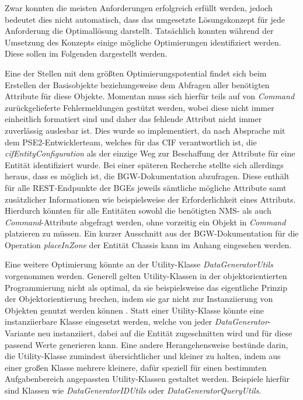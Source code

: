 Zwar konnten die meisten Anforderungen erfolgreich erfüllt werden, jedoch bedeutet dies nicht automatisch, dass das umgesetzte Lösungskonzept für jede Anforderung die Optimallösung darstellt. Tatsächlich konnten während der Umsetzung des Konzepts einige mögliche Optimierungen identifiziert werden. Diese sollen im Folgenden dargestellt werden.

Eine der Stellen mit dem größten Optimierungspotential findet sich beim Erstellen der Basisobjekte beziehungsweise dem Abfragen aller benötigten Attribute für diese Objekte. Momentan muss sich hierfür teils auf von \textit{Command} zurückgelieferte Fehlermeldungen gestützt werden, wobei diese nicht immer einheitlich formatiert sind und daher das fehlende Attribut nicht immer zuverlässig auslesbar ist. Dies wurde so implementiert, da nach Absprache mit dem PSE2-Entwicklerteam, welches für das \ac{CIF} verantwortlich ist, die \textit{cifEntityConfiguration} als der einzige Weg zur Beschaffung der Attribute für eine Entität identifiziert wurde. Bei einer späteren Recherche stellte sich allerdings heraus, dass es möglich ist, die \ac{BGW}-Dokumentation abzufragen. Diese enthält für alle \ac{REST}-Endpunkte der \ac{BGE}s jeweils sämtliche mögliche Attribute samt zusätzlicher Informationen wie beispielsweise der Erforderlichkeit eines Attributs. Hierdurch könnten für alle Entitäten sowohl die benötigten \ac{NMS}- als auch \textit{Command}-Attribute abgefragt werden, ohne vorzeitig ein Objekt in \textit{Command} platzieren zu müssen. Ein kurzer Ausschnitt aus der \ac{BGW}-Dokumentation für die Operation \textit{placeInZone} der Entität Chassis kann im Anhang  eingesehen werden.

Eine weitere Optimierung könnte an der Utility-Klasse \textit{DataGeneratorUtils} vorgenommen werden. Generell gelten Utility-Klassen in der objektorientierten Programmierung nicht als optimal, da sie beispielsweise das eigentliche Prinzip der Objektorientierung brechen, indem sie gar nicht zur Instanziierung von Objekten genutzt werden können \cite{ruzicka:2017}. Statt einer Utility-Klasse könnte eine instanziierbare Klasse eingesetzt werden, welche von jeder \textit{DataGenerator}-Variante neu instanziiert, dabei auf die Entität zugeschnitten wird und für diese passend Werte generieren kann. Eine andere Herangehensweise bestünde darin, die Utility-Klasse zumindest übersichtlicher und kleiner zu halten, indem aus einer großen Klasse mehrere kleinere, dafür speziell für einen bestimmten Aufgabenbereich angepassten Utility-Klassen gestaltet werden. Beispiele hierfür sind Klassen wie \textit{DataGeneratorIDUtils} oder \textit{DataGeneratorQueryUtils}.

